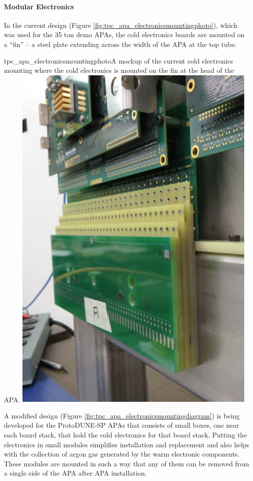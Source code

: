\paragraph{Modular Electronics}
In the current design (Figure \ref{fig:tpc_apa_electronicsmountingphoto}), which was used for the 35 ton demo APAs, the cold electronics boards are mounted on a ``fin'' -- a steel plate extending across the width of the APA at the top tube.

\begin{cdrfigure}{tpc_apa_electronicsmountingphoto}{A mockup of the current cold electronics mounting where the cold electronics is mounted on the fin at the head of the APA.}
\includegraphics[width=0.9\textwidth]{figures/tpc_apa_electronicsmountingphoto.png} 
\end{cdrfigure}

A modified design (Figure \ref{fig:tpc_apa_electronicsmountingdiagram}) is being developed for the ProtoDUNE-SP APAs that consists of small boxes, one near each board stack, that hold the cold electronics for that board stack.  Putting the electronics in small modules simplifies installation and replacement and also helps with the collection of argon gas generated by the warm electronic components.  These modules are mounted in such a way that any of them can be removed from a single side of the APA after APA installation.

